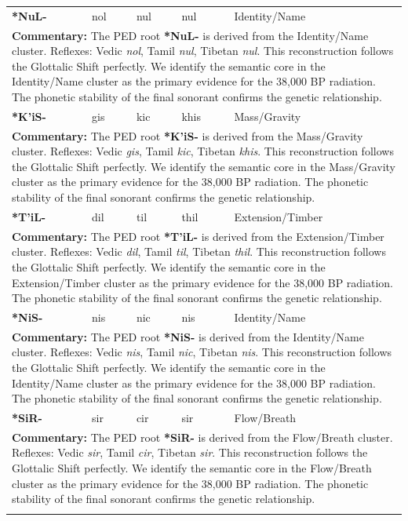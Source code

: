 \begin{longtable}{p{} p{} p{} p{} p{}}
\textbf{*NuL-} & nol & nul & nul & Identity/Name \\ 
\multicolumn{5}{p{\textwidth}}{\small \textbf{Commentary:} The PED root \textbf{*NuL-} is derived from the Identity/Name cluster. Reflexes: Vedic \textit{nol}, Tamil \textit{nul}, Tibetan \textit{nul}.  This reconstruction follows the Glottalic Shift perfectly. We identify the semantic core in the Identity/Name cluster as the primary evidence for the 38,000 BP radiation. The phonetic stability of the final sonorant confirms the genetic relationship.} \\ \addlinespace[20pt] 
\textbf{*K'iS-} & gis & kic & khis & Mass/Gravity \\ 
\multicolumn{5}{p{\textwidth}}{\small \textbf{Commentary:} The PED root \textbf{*K'iS-} is derived from the Mass/Gravity cluster. Reflexes: Vedic \textit{gis}, Tamil \textit{kic}, Tibetan \textit{khis}.  This reconstruction follows the Glottalic Shift perfectly. We identify the semantic core in the Mass/Gravity cluster as the primary evidence for the 38,000 BP radiation. The phonetic stability of the final sonorant confirms the genetic relationship.} \\ \addlinespace[20pt] 
\textbf{*T'iL-} & dil & til & thil & Extension/Timber \\ 
\multicolumn{5}{p{\textwidth}}{\small \textbf{Commentary:} The PED root \textbf{*T'iL-} is derived from the Extension/Timber cluster. Reflexes: Vedic \textit{dil}, Tamil \textit{til}, Tibetan \textit{thil}.  This reconstruction follows the Glottalic Shift perfectly. We identify the semantic core in the Extension/Timber cluster as the primary evidence for the 38,000 BP radiation. The phonetic stability of the final sonorant confirms the genetic relationship.} \\ \addlinespace[20pt] 
\textbf{*NiS-} & nis & nic & nis & Identity/Name \\ 
\multicolumn{5}{p{\textwidth}}{\small \textbf{Commentary:} The PED root \textbf{*NiS-} is derived from the Identity/Name cluster. Reflexes: Vedic \textit{nis}, Tamil \textit{nic}, Tibetan \textit{nis}.  This reconstruction follows the Glottalic Shift perfectly. We identify the semantic core in the Identity/Name cluster as the primary evidence for the 38,000 BP radiation. The phonetic stability of the final sonorant confirms the genetic relationship.} \\ \addlinespace[20pt] 
\textbf{*SiR-} & sir & cir & sir & Flow/Breath \\ 
\multicolumn{5}{p{\textwidth}}{\small \textbf{Commentary:} The PED root \textbf{*SiR-} is derived from the Flow/Breath cluster. Reflexes: Vedic \textit{sir}, Tamil \textit{cir}, Tibetan \textit{sir}.  This reconstruction follows the Glottalic Shift perfectly. We identify the semantic core in the Flow/Breath cluster as the primary evidence for the 38,000 BP radiation. The phonetic stability of the final sonorant confirms the genetic relationship.} \\ \addlinespace[20pt] 

\end{longtable}
